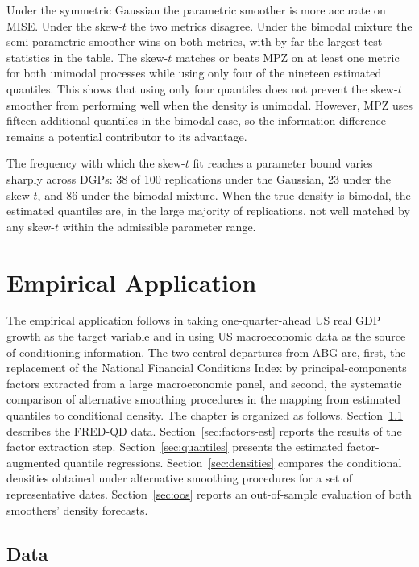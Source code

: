 \documentclass[12pt]{report} %
\begin{document}
Under the symmetric Gaussian the parametric smoother is more accurate on MISE. Under the skew-$t$ the two metrics disagree. Under the bimodal mixture the semi-parametric smoother wins on both metrics, with by far the largest test statistics in the table. The skew-$t$ matches or beats MPZ on at least one metric for both unimodal processes while using only four of the nineteen estimated quantiles. This shows that using only four quantiles does not prevent the skew-$t$ smoother from performing well when the density is unimodal. However, MPZ uses fifteen additional quantiles in the bimodal case, so the information difference remains a potential contributor to its advantage.

The frequency with which the skew-$t$ fit reaches a parameter bound varies sharply across DGPs: 38 of 100 replications under the Gaussian, 23 under the skew-$t$, and 86 under the bimodal mixture. When the true density is bimodal, the estimated quantiles are, in the large majority of replications, not well matched by any skew-$t$ within the admissible parameter range.


\chapter{Empirical Application}
\label{ch:empirical}

The empirical application follows \textcite{adrian2019vulnerable} in taking one-quarter-ahead US real GDP growth as the target variable and in using US macroeconomic data as the source of conditioning information. The two central departures from ABG are, first, the replacement of the National Financial Conditions Index by principal-components factors extracted from a large macroeconomic panel, and second, the systematic comparison of alternative smoothing procedures in the mapping from estimated quantiles to conditional density. The chapter is organized as follows. Section~\ref{sec:data} describes the FRED-QD data. Section~\ref{sec:factors-est} reports the results of the factor extraction step. Section~\ref{sec:quantiles} presents the estimated factor-augmented quantile regressions. Section~\ref{sec:densities} compares the conditional densities obtained under alternative smoothing procedures for a set of representative dates. Section~\ref{sec:oos} reports an out-of-sample evaluation of both smoothers' density forecasts.

\section{Data}
\label{sec:data}
\end{document}
